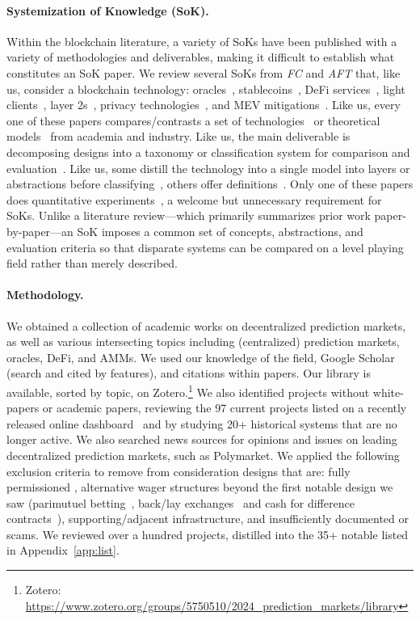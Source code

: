 \paragraph{Systemization of Knowledge (SoK).} Within the blockchain literature, a variety of SoKs have been published with a variety of methodologies and deliverables, making it difficult to establish what constitutes an SoK paper. We review several SoKs from \textit{FC} and \textit{AFT} that, like us, consider a blockchain technology: oracles~\cite{ClEsGS21}, stablecoins~\cite{MSS20}, DeFi services~\cite{WPG+22}, light clients~\cite{CBC22}, layer 2s~\cite{GMR+20}, privacy technologies~\cite{BCDF23}, and MEV mitigations~\cite{HW22}. Like us, every one of these papers compares/contrasts a set of technologies~\cite{ClEsGS21,MSS20,WPG+22,GMR+20} or theoretical models~\cite{CBC22,BCDF23,HW22} from academia and industry. Like us, the main deliverable is decomposing designs into a taxonomy or classification system for comparison and evaluation~\cite{ClEsGS21,MSS20,WPG+22,GMR+20,CBC22,BCDF23,HW22}. Like us, some distill the technology into a single model into layers or abstractions before classifying~\cite{ClEsGS21}, others offer definitions~\cite{CBC22,WPG+22}. Only one of these papers does quantitative experiments~\cite{WPG+22}, a welcome but unnecessary requirement for SoKs. Unlike a literature review---which primarily summarizes prior work paper-by-paper---an SoK imposes a common set of concepts, abstractions, and evaluation criteria so that disparate systems can be compared on a level playing field rather than merely described.


\paragraph{Methodology.} We obtained a collection of academic works on decentralized prediction markets, as well as various intersecting topics including (centralized) prediction markets, oracles, DeFi, and AMMs. We used our knowledge of the field, Google Scholar (search and cited by features), and citations within papers. Our library is available, sorted by topic, on Zotero.\footnote{Zotero: \url{https://www.zotero.org/groups/5750510/2024_prediction_markets/library}} We also identified projects without white-papers or academic papers, reviewing the 97 current projects listed on a recently released online dashboard~\cite{Sal25} and by studying 20+ historical systems that are no longer active. We also searched news sources for opinions and issues on leading decentralized prediction markets, such as Polymarket. We applied the following exclusion criteria to remove from consideration designs that are: fully permissioned \cepms, alternative wager structures beyond the first notable design we saw (\eg parimutuel betting~\cite{ThZi88,KNZ08,ULSM25}, back/lay exchanges~\cite{CHKL21} and cash for difference contracts~\cite{ACES17}), supporting/adjacent infrastructure, and insufficiently documented or scams. We reviewed over a hundred projects, distilled into the 35+ notable \depms listed in Appendix~\ref{app:list}.




